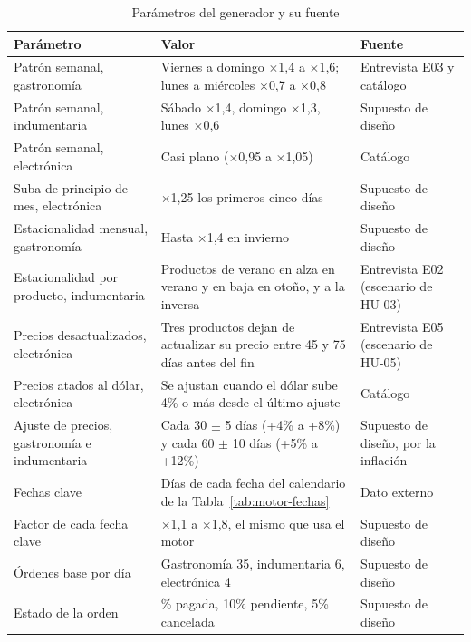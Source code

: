 \begin{table}[!htbp]
\centering
\caption{Parámetros del generador y su fuente}
\label{tab:eval-parametros}
\renewcommand{\arraystretch}{1.3}
\footnotesize
\setlength{\tabcolsep}{4pt}
\begin{tabular}{|>{\raggedright\arraybackslash}m{3.4cm}|>{\raggedright\arraybackslash}m{5.2cm}|>{\raggedright\arraybackslash}m{4.2cm}|}
\hline
\textbf{Parámetro} & \textbf{Valor} & \textbf{Fuente} \\
\hline
Patrón semanal, gastronomía & Viernes a domingo $\times$1,4 a $\times$1,6; lunes a miércoles $\times$0,7 a $\times$0,8 & Entrevista E03 y catálogo \\
\hline
Patrón semanal, indumentaria & Sábado $\times$1,4, domingo $\times$1,3, lunes $\times$0,6 & Supuesto de diseño \\
\hline
Patrón semanal, electrónica & Casi plano ($\times$0,95 a $\times$1,05) & Catálogo \\
\hline
Suba de principio de mes, electrónica & $\times$1,25 los primeros cinco días & Supuesto de diseño \\
\hline
Estacionalidad mensual, gastronomía & Hasta $\times$1,4 en invierno & Supuesto de diseño \\
\hline
Estacionalidad por producto, indumentaria & Productos de verano en alza en verano y en baja en otoño, y a la inversa & Entrevista E02 (escenario de HU-03) \\
\hline
Precios desactualizados, electrónica & Tres productos dejan de actualizar su precio entre 45 y 75 días antes del fin & Entrevista E05 (escenario de HU-05) \\
\hline
Precios atados al dólar, electrónica & Se ajustan cuando el dólar sube 4\% o más desde el último ajuste & Catálogo \\
\hline
Ajuste de precios, gastronomía e indumentaria & Cada 30 $\pm$ 5 días (+4\% a +8\%) y cada 60 $\pm$ 10 días (+5\% a +12\%) & Supuesto de diseño, por la inflación \\
\hline
Fechas clave & Días de cada fecha del calendario de la Tabla~\ref{tab:motor-fechas} & Dato externo \\
\hline
Factor de cada fecha clave & $\times$1,1 a $\times$1,8, el mismo que usa el motor & Supuesto de diseño \\
\hline
Órdenes base por día & Gastronomía 35, indumentaria 6, electrónica 4 & Supuesto de diseño \\
\hline
Estado de la orden & 85\% pagada, 10\% pendiente, 5\% cancelada & Supuesto de diseño \\

\end{tabular}
\end{table}
